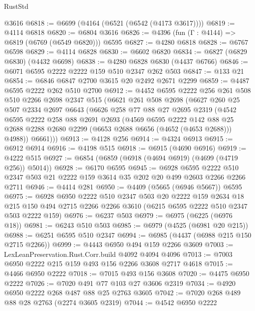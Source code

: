 \begin{lexlean}{RustStd}
\begin{coremodule}
    @3616
@6818 := @6699 (@4164 (@6521 (@6542 (@4173 @3617))))
@6819 := @4114 @6818
@6820 := @6804 @3616
@6826 := @4396 (fun (Γ : @4144) => @6819 (@6769 (@6549 @6820))) @6595
@6827 := @4280 @6818
@6828 := @6767 @6598
@6829 := @4114 @6828
@6830 := @6602 @6820
@6834 := @6827 (@6829 @6830) (@4432 @6698)
@6838 := @4280 @6828 @6830 (@4437 @6766)
@6846 := @6071 @6595 @2222 @2222 @159 @510 @2347 @262 @503
@6847 := @133 @21
@6854 := @6846 @6847 @2700 @3615 @20 @2492 @2671 @2299
@6859 := @4487 @6595 @2222 @262 @510 @2700
@6912 := @4452
    @6595
    @2222
    @256
    @261
    @508
    @510
    @2266
    @2698
    @2347
    @515
    (@6621
      @261
      @508
      @2698
      (@6627
        @260
        @25
        @507
        @2334
        @2697
        @6643
        (@6626
          @258
          @77
          @88
          @27
          @2695
          @2319
          (@4542
            @6595
            @2222
            @258
            @88
            @2691
            @2693
            (@4569
              @6595
              @2222
              @142
              @88
              @25
              @2688
              @2288
              @2680
              @2299
              (@6653 @2688 @6656 (@4652 (@4653 @2688)))
              @4988))
          @6661)))
@6913 := @4128 @256
@6914 := @4324 @6913
@6915 := @6912 @6914
@6916 := @4198 @515
@6918 := @6915 (@4690 @6916)
@6919 := @4222 @515
@6927 := @6854 (@6859 (@6918 (@4694 @6919) (@4699 (@4719 @256)) @5014))
@6928 := @6170 @6595
@6945 := @6928
    @6595
    @2222
    @510
    @2347
    @503
    @21
    @2222
    @159
    @3614
    @35
    @202
    @20
    @499
    @2603
    @2266
    @2266
    @2711
@6946 := @4414 @281
@6950 := @4409 (@5665 (@6946 @5667)) @6595
@6975 := @6928
    @6950
    @2222
    @510
    @2347
    @503
    @20
    @2222
    @159
    @2634
    @18
    @215
    @150
    @494
    @2715
    @2266
    @2266
    @3610
    (@6215 @6595 @2222 @510 @2347 @503 @2222 @159)
@6976 := @6237 @503
@6979 := @6975 (@6225 (@6976 @18))
@6981 := @6243 @510 @503
@6985 := @6979 (@4525 (@6981 @20 @215))
@6988 := @6251 @6595 @510 @2347
@6994 := @6985 (@4437 (@6988 @215 @150 @2715 @2266))
@6999 := @4443 @6950 @494 @159 @2266 @3609
@7003 := LexLeanPreservation.Rust.Corr.build @4092 @4094 @4096
@7013 := @7003 @6950 @2222 @215 @159 @493 @156 @2266 @3608 @2717 @4618
@7015 := @4466 @6950 @2222
@7018 := @7015 @493 @156 @3608
@7020 := @4475 @6950 @2222
@7026 := @7020 @491 @77 @103 @27 @3606 @2319
@7034 := @4920 @6950 @2222 @268 @487 @88 @25 @2763 @3605
@7042 := @7020 @268 @489 @88 @28 @2763 (@2274 @3605 @2319)
@7044 := @4542 @6950 @2222

\end{coremodule}
\end{lexlean}
